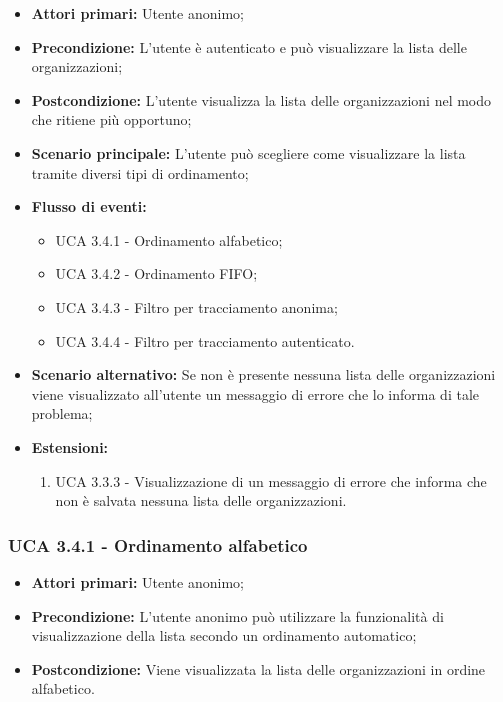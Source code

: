 \begin{itemize} 
	\item \textbf{Attori primari:} Utente anonimo;
	\item \textbf{Precondizione:}  L'utente è autenticato e può visualizzare la lista delle organizzazioni;
	\item \textbf{Postcondizione:} L'utente visualizza la lista delle organizzazioni nel modo che ritiene più opportuno;
	\item \textbf{Scenario principale:}	L'utente può scegliere come visualizzare la lista tramite diversi tipi di ordinamento;
	\item \textbf{Flusso di eventi:}
	\begin{itemize}
		\item UCA 3.4.1 - Ordinamento alfabetico;
		\item UCA 3.4.2 - Ordinamento FIFO;
		\item UCA 3.4.3 - Filtro per tracciamento anonima;
		\item UCA 3.4.4 - Filtro per tracciamento autenticato.
	\end{itemize}
	\item \textbf{Scenario alternativo:} Se non è presente nessuna lista delle organizzazioni viene visualizzato all'utente un messaggio di errore che lo informa di tale problema;
	\item \textbf{Estensioni:}
	\begin{enumerate}
		\item UCA 3.3.3 - Visualizzazione di un messaggio di errore che informa che non è salvata nessuna lista delle organizzazioni.
	\end{enumerate}
\end{itemize}

\subsubsection{UCA 3.4.1 - Ordinamento alfabetico}%
\begin{itemize}
	\item \textbf{Attori primari:} Utente anonimo;
	\item \textbf{Precondizione:} L'utente anonimo può utilizzare la funzionalità di visualizzazione della lista secondo un ordinamento automatico;
	\item \textbf{Postcondizione:} Viene visualizzata la lista delle organizzazioni in ordine alfabetico.
\end{itemize}

